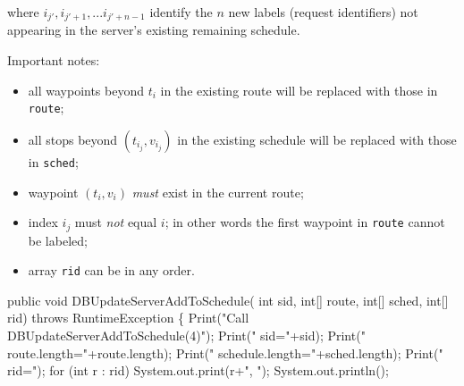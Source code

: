 \documentclass{article}
\theoremstyle{definition}                   %
\begin{document}
\noindent where $i_{j'},i_{j'+1},...i_{j'+n-1}$ identify the $n$ new labels
(request identifiers) not appearing in the server's existing remaining
schedule.

Important notes:
\begin{itemize}
\item all waypoints beyond $t_i$ in the existing route will be replaced with
those in {\tt{}route};
\item all stops beyond $(t_{i_j},v_{i_j})$ in the existing schedule will be
replaced with those in {\tt{}sched};
\item waypoint $(t_i,v_i)$ \emph{must} exist in the current route;
\item index $i_j$ must \emph{not} equal $i$; in other words the first waypoint
in {\tt{}route} cannot be labeled;
\item array {\tt{}rid} can be in any order.
\end{itemize}
\nwenddocs{}\endmoddef{}
public void DBUpdateServerAddToSchedule(
    int sid, int[] route, int[] sched, int[] rid)
throws RuntimeException \{
  Print("Call DBUpdateServerAddToSchedule(4)");
  Print("  sid="+sid);
  Print("  route.length="+route.length);
  Print("  schedule.length="+sched.length);
  Print("  rid=");
  for (int r : rid)
    System.out.print(r+", ");
  System.out.println();
\end{document}
